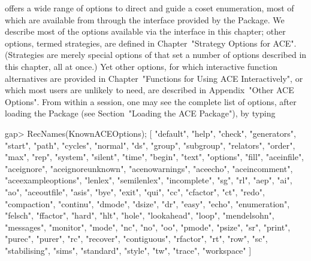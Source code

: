 

{\ACE} offers a wide range of options to  direct  and  guide  a  coset
enumeration, most of which  are  available  from  {\GAP}  through  the
interface provided by the {\ACE} Package.  We  describe  most  of  the
options available via the interface in this  chapter;  other  options,
termed strategies, are defined in Chapter~"Strategy Options for  ACE".
(Strategies are merely special options of {\ACE} that set a number  of
options described in this chapter, all at once.)  Yet  other  options,
for  which  interactive  function   alternatives   are   provided   in
Chapter~"Functions for Using ACE Interactively", or which most  {\GAP}
users are unlikely to  need,  are  described  in  Appendix~"Other  ACE
Options". From within a {\GAP} session, one may see the complete  list
of  {\ACE}  options,   after   loading   the   {\ACE}   Package   (see
Section~"Loading the ACE Package"), by typing

\beginexample
gap> RecNames(KnownACEOptions);
[ "default", "help", "check", "generators", "start", "path", "cycles", 
  "normal", "ds", "group", "subgroup", "relators", "order", "max", "rep", 
  "system", "silent", "time", "begin", "text", "options", "fill", 
  "aceinfile", "aceignore", "aceignoreunknown", "acenowarnings", "aceecho", 
  "aceincomment", "aceexampleoptions", "lenlex", "semilenlex", "incomplete", 
  "sg", "rl", "aep", "ai", "ao", "aceoutfile", "asis", "bye", "exit", "qui", 
  "cc", "cfactor", "ct", "redo", "compaction", "continu", "dmode", "dsize", 
  "dr", "easy", "echo", "enumeration", "felsch", "ffactor", "hard", 
  "hlt", "hole", "lookahead", "loop", "mendelsohn", "messages", "monitor", 
  "mode", "nc", "no", "oo", "pmode", "psize", "sr", "print", "purec", 
  "purer", "rc", "recover", "contiguous", "rfactor", "rt", "row", "sc", 
  "stabilising", "sims", "standard", "style", "tw",
  "trace", "workspace" ]

